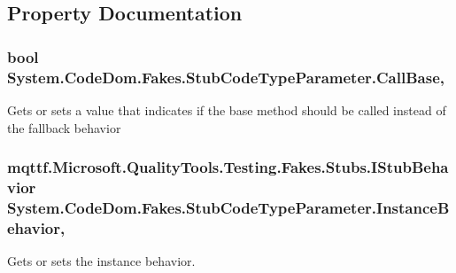 \subsection{Property Documentation}
\hypertarget{class_system_1_1_code_dom_1_1_fakes_1_1_stub_code_type_parameter_ae2b53fd2b243bf4cd1ebcfe75697af58}{
\subsubsection[{Call\-Base}]{\setlength{\rightskip}{0pt plus 5cm}bool System.\-Code\-Dom.\-Fakes.\-Stub\-Code\-Type\-Parameter.\-Call\-Base\hspace{0.3cm}{\ttfamily [get]}, {\ttfamily [set]}}}\label{class_system_1_1_code_dom_1_1_fakes_1_1_stub_code_type_parameter_ae2b53fd2b243bf4cd1ebcfe75697af58}


Gets or sets a value that indicates if the base method should be called instead of the fallback behavior

\hypertarget{class_system_1_1_code_dom_1_1_fakes_1_1_stub_code_type_parameter_a7cbe55c3695852292d333ff5bc5d8174}{
\subsubsection[{Instance\-Behavior}]{\setlength{\rightskip}{0pt plus 5cm}mqttf.\-Microsoft.\-Quality\-Tools.\-Testing.\-Fakes.\-Stubs.\-I\-Stub\-Behavior System.\-Code\-Dom.\-Fakes.\-Stub\-Code\-Type\-Parameter.\-Instance\-Behavior\hspace{0.3cm}{\ttfamily [get]}, {\ttfamily [set]}}}\label{class_system_1_1_code_dom_1_1_fakes_1_1_stub_code_type_parameter_a7cbe55c3695852292d333ff5bc5d8174}


Gets or sets the instance behavior.

